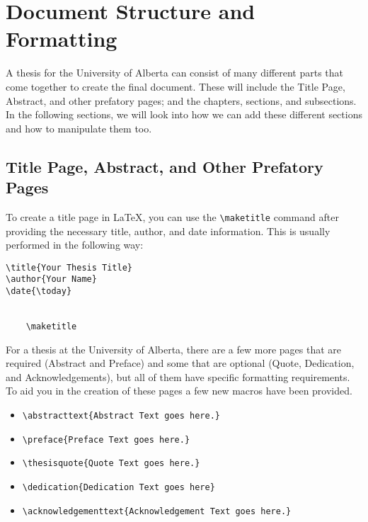 \chapter{Document Structure and Formatting}
A thesis for the University of Alberta can consist of many different parts that come together to create the final document.
These will include the Title Page, Abstract, and other prefatory pages; and the chapters, sections, and subsections.
In the following sections, we will look into how we can add these different sections and how to manipulate them too.
\section{Title Page, Abstract, and Other Prefatory Pages}
To create a title page in \LaTeX{}, you can use the \lstinline|\maketitle| command after providing the necessary title, author, and date information. 
This is usually performed in the following way:

\begin{lstlisting}[style=LaTeXStyle]
\title{Your Thesis Title}
\author{Your Name}
\date{\today}


	\maketitle

\end{lstlisting}

For a thesis at the University of Alberta, there are a few more pages that are required (Abstract and Preface) and some that are optional (Quote, Dedication, and Acknowledgements), but all of them have specific formatting requirements.
To aid you in the creation of these pages a few new macros have been provided.
\begin{itemize}
	\item \lstinline|\abstracttext{Abstract Text goes here.}|
	\item \lstinline|\preface{Preface Text goes here.}|
	\item \lstinline|\thesisquote{Quote Text goes here.}|
	\item \lstinline|\dedication{Dedication Text goes here}|
	\item \lstinline|\acknowledgementtext{Acknowledgement Text goes here.}|
\end{itemize}

